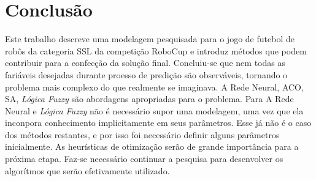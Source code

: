 \chapter{Conclusão}\label{cap:conclusao}

Este trabalho descreve uma modelagem pesquisada para o jogo de futebol de robôs da
categoria SSL da competição RoboCup e introduz métodos que podem
contribuir para a confecção da solução final. Concluiu-se que nem todas as fariáveis
desejadas durante  proesso de predição são observáveis, tornando o problema mais
complexo do que realmente se imaginava. A Rede Neural, ACO, SA, \textit{Lógica Fuzzy} são 
abordagens apropriadas para o problema. Para A Rede Neural e \textit{Lógica Fuzzy}
não é necessário supor uma modelagem, uma vez que ela inconpora conhecimento
implicitamente em seus parâmetros. Esse já não é o caso dos métodos restantes, e por isso
foi necessário definir alguns parâmetros inicialmente.
As heurísticas de otimização serão de grande importância para a próxima etapa.
Faz-se necessário continuar a pesquisa para desenvolver os algorítmos que serão
efetivamente utilizado.
